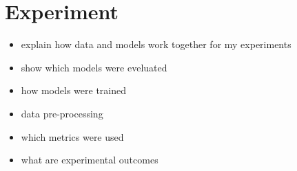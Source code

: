 \section{Experiment}

\begin{itemize}
  \item explain how data and models work together for my experiments
  \item show which models were eveluated
  \item how models were trained
  \item data pre-processing
  \item which metrics were used
  \item what are experimental outcomes
\end{itemize}
